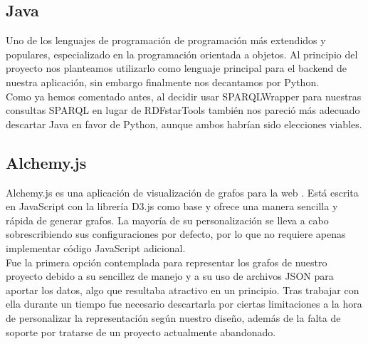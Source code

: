 \subsection*{Java}

Uno de los lenguajes de programación de programación más extendidos y populares, especializado en la programación orientada a objetos. Al principio del proyecto nos planteamos utilizarlo como lenguaje principal para el backend de nuestra aplicación, sin embargo finalmente nos decantamos por Python.\\

Como ya hemos comentado antes, al decidir usar SPARQLWrapper para nuestras consultas SPARQL en lugar de RDFstarTools también nos pareció más adecuado descartar Java en favor de Python, aunque ambos habrían sido elecciones viables. 

\subsection*{Alchemy.js}

Alchemy.js es una aplicación de visualización de grafos para la web \cite{alchemyjs}. Está escrita en JavaScript con la librería D3.js como base y ofrece una manera sencilla y rápida de generar grafos. La mayoría de su personalización se lleva a cabo sobrescribiendo sus configuraciones por defecto, por lo que no requiere apenas implementar código JavaScript adicional.\\

Fue la primera opción contemplada para representar los grafos de nuestro proyecto debido a su sencillez de manejo y a su uso de archivos JSON para aportar los datos, algo que resultaba atractivo en un principio. Tras trabajar con ella durante un tiempo fue necesario descartarla por ciertas limitaciones a la hora de personalizar la representación según nuestro diseño, además de la falta de soporte por tratarse de un proyecto actualmente abandonado.
